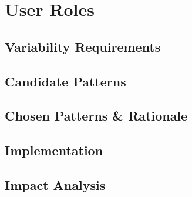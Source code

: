 \section{User Roles}\label{sec:fa_roles}

\subsection{Variability Requirements}\label{sec:fa_roles_variability_requirements}

\subsection{Candidate Patterns}\label{sec:fa_roles_candidate_patterns}

\subsection{Chosen Patterns \& Rationale}\label{sec:fa_roles_chosen_patterns_rationale}

\subsection{Implementation}\label{sec:fa_roles_implementation}

\subsection{Impact Analysis}\label{sec:fa_roles_impact_analysis}
